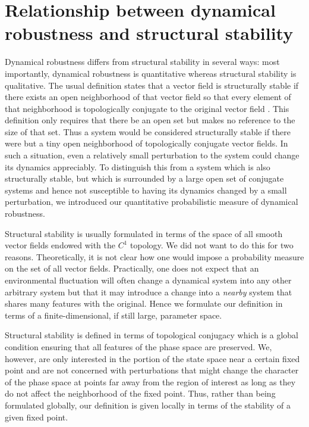 \section{Relationship between dynamical robustness and structural stability}\label{sec:dynrobustandstructstab}

Dynamical robustness differs from structural stability in several ways: most importantly, dynamical robustness is quantitative whereas structural stability is qualitative.  The usual definition states that a vector field is structurally stable if there exists an open neighborhood of that vector field so that every element of that neighborhood is topologically conjugate to the original vector field \cite{Smale1967}.  This definition only requires that there be an open set but makes no reference to the size of that set.  Thus a system would be considered structurally stable if there were but a tiny open neighborhood of topologically conjugate vector fields.  In such a situation, even a relatively small perturbation to the system could change its dynamics appreciably.  To distinguish this from a system which is also structurally stable, but which is surrounded by a large open set of conjugate systems and hence not susceptible to having its dynamics changed by a small perturbation, we introduced our quantitative probabilistic measure of dynamical robustness.

Structural stability is usually formulated in terms of the space of all smooth vector fields endowed with the $C^1$ topology.  We did not want to do this for two reasons.  Theoretically, it is not clear how one would impose a probability measure on the set of all vector fields.  Practically, one does not expect that an environmental fluctuation will often change a dynamical system into any other arbitrary system but that it may introduce a change into a \emph{nearby} system that shares many features with the original.  Hence we formulate our definition in terms of a finite-dimensional, if still large, parameter space.

Structural stability is defined in terms of topological conjugacy which is a global condition ensuring that all features of the phase space are preserved.  We, however, are only interested in the portion of the state space near a certain fixed point and are not concerned with perturbations that might change the character of the phase space at points far away from the region of interest as long as they do not affect the neighborhood of the fixed point.  Thus, rather than being formulated globally, our definition is given locally in terms of the stability of a given fixed point.
